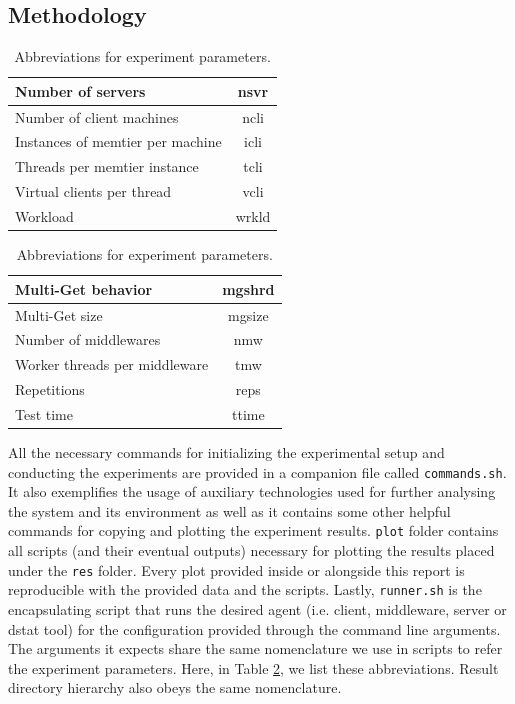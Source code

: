 \documentclass[11pt,a4paper]{article}
\begin{document}
\subsection{Methodology} \label{sec:ov-methodology}
\begin{table}
\begin{minipage}{.5\textwidth}
	\centering
	\begin{tabular}{|l|c|}
		\hline Number of servers                & nsvr		\\
		\hline Number of client machines        & ncli		\\
		\hline Instances of memtier per machine & icli		\\
		\hline Threads per memtier instance     & tcli		\\
		\hline Virtual clients per thread       & vcli		\\
		\hline Workload                         & wrkld		\\
		\hline 
	\end{tabular}
\end{minipage}%
\begin{minipage}{.5\textwidth}
	\centering
	\begin{tabular}{|l|c|}
		\hline Multi-Get behavior               & mgshrd	\\
		\hline Multi-Get size                   & mgsize	\\
		\hline Number of middlewares            & nmw		\\
		\hline Worker threads per middleware    & tmw		\\
		\hline Repetitions                      & reps		\\
		\hline Test time                        & ttime		\\
		\hline 
	\end{tabular}
\end{minipage}
\caption{Abbreviations for experiment parameters.} \label{tab:param-abbrs}
\end{table}
All the necessary commands for initializing the experimental setup and conducting the experiments are provided in a companion file called \texttt{commands.sh}. It also exemplifies the usage of auxiliary technologies used for further analysing the system and its environment as well as it contains some other helpful commands for copying and plotting the experiment results. \texttt{plot} folder contains all scripts (and their eventual outputs) necessary for plotting the results placed under the \texttt{res} folder. Every plot provided inside or alongside this report is reproducible with the provided data and the scripts. Lastly, \texttt{runner.sh} is the encapsulating script that runs the desired agent (i.e. client, middleware, server or dstat \cite{dstat} tool) for the configuration provided through the command line arguments. The arguments it expects share the same nomenclature we use	in scripts to refer the experiment parameters. Here, in Table \ref{tab:param-abbrs}, we list these abbreviations. Result directory hierarchy also obeys the same nomenclature.
\end{document}
